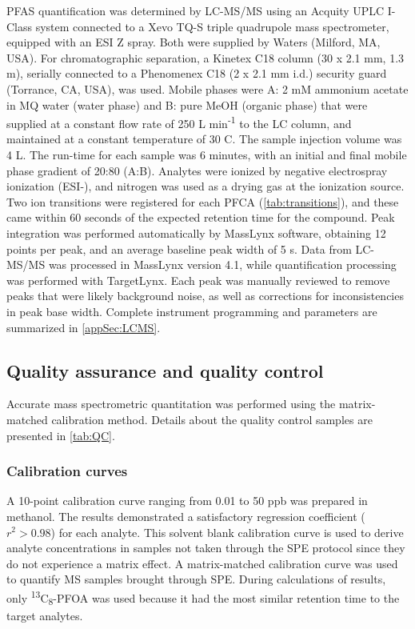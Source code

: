 PFAS quantification was determined by \acrshort{LC-MS/MS} using an Acquity UPLC I-Class system connected to a Xevo TQ-S triple quadrupole mass spectrometer, equipped with an ESI Z spray. Both were supplied by Waters (Milford, MA, USA). For chromatographic separation, a Kinetex C18 column (30 x 2.1 mm, 1.3 \textmu m), serially connected to a Phenomenex C18 (2 x 2.1 mm i.d.) security guard (Torrance, CA, USA), was used. Mobile phases were A: 2 mM ammonium acetate in MQ water (water phase) and B: pure MeOH (organic phase) that were supplied at a constant flow rate of 250 \textmu L min\textsuperscript{-1} to the LC column, and maintained at a constant temperature of 30 \textdegree C. The sample injection volume was 4 \textmu L. The run-time for each sample was 6 minutes, with an initial and final mobile phase gradient of 20:80 (A:B). Analytes were ionized by negative electrospray ionization (\acrshort{ESI}-), and nitrogen was used as a drying gas at the ionization source. Two ion transitions were registered for each PFCA (\cref{tab:transitions}), and these came within 60 seconds of the expected retention time for the compound. Peak integration was performed automatically by MassLynx software, obtaining 12 points per peak, and an average baseline peak width of 5 s. Data from LC-MS/MS was processed in MassLynx version 4.1, while quantification processing was performed with TargetLynx. Each peak was manually reviewed to remove peaks that were likely background noise, as well as corrections for inconsistencies in peak base width. Complete instrument programming and parameters are summarized in \cref{appSec:LCMS}.



\subsection{Quality assurance and quality control}
Accurate mass spectrometric quantitation was performed using the matrix-matched calibration method. Details about the quality control samples are presented in \cref{tab:QC}.

\subsubsection{Calibration curves}
A 10-point calibration curve ranging from 0.01 to 50 ppb was prepared in methanol. The results demonstrated a satisfactory regression coefficient ($r^2 > 0.98$) for each analyte. This solvent blank calibration curve is used to derive analyte concentrations in samples not taken through the SPE protocol since they do not experience a matrix effect. A matrix-matched calibration curve was used to quantify MS samples brought through SPE. During calculations of results, only \textsuperscript{13}C\textsubscript{8}-PFOA was used because it had the most similar retention time to the target analytes. 

